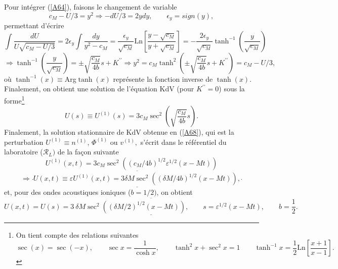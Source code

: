 \documentclass[10pt,thmsa]{article}
\begin{document}
Pour int\'{e}grer (\ref{A64}), faisons le changement de variable
\begin{equation}
c_{M}-U/3=y^{2}\Rightarrow-dU/3=2ydy,\qquad\epsilon_{y}=sign(y),\label{A65}%
\end{equation}
permettant d'\'{e}crire
\begin{equation}
\int\frac{dU}{U\sqrt{c_{M}-U/3}}=2\epsilon_{y}\int\frac{dy}{y^{2}-c_{M}}%
=\frac{\epsilon_{y}}{\sqrt{c_{M}}}\mathrm{Ln}\left[  \frac{y-\sqrt{c_{M}}%
}{y+\sqrt{c_{M}}}\right]  =-\frac{2\epsilon_{y}}{\sqrt{c_{M}}}\tanh^{-1}%
(\frac{y}{\sqrt{c_{M}}})\label{A66}%
\end{equation}
\begin{equation}
\Rightarrow\tanh^{-1}(\frac{y}{\sqrt{c_{M}}})=\pm\sqrt{\frac{c_{M}}{4b}%
}s+K^{\prime\prime}\Rightarrow y^{2}=c_{M}\tanh^{2}\left(  \pm\sqrt
{\frac{c_{M}}{4b}}s+K^{\prime\prime}\right)  =c_{M}-U/3,\label{A67}%
\end{equation}
o\`{u} $\tanh^{-1}(x)\equiv$Arg$\tanh(x)$ repr\'{e}sente la fonction inverse
de $\tanh(x)$. Finalement, on obtient une solution de l'\'{e}quation KdV (pour
$K^{\prime\prime}=0$) sous la forme\footnote{On tient compte des relations
suivantes
\[
\sec(x)=\sec(-x),\qquad\sec x=\frac{1}{\cosh x},\qquad\tanh^{2}x+\sec
^{2}x=1\qquad\tanh^{-1}x=\frac{1}{2}\mathrm{Ln}\left[  \frac{x+1}{x-1}\right]
.
\]
}
\begin{equation}
U(s)\equiv U^{(1)}(s)=3c_{M}\sec^{2}\left(  \sqrt{\frac{c_{M}}{4b}}s\right)
.\label{A68}%
\end{equation}
Finalement, la solution stationnaire de KdV obtenue en (\ref{A68}), qui est la
perturbation $U^{(1)}\equiv n^{(1)}$, $\Phi^{(1)}$ ou $v^{(1)},$ s'\'{e}crit
dans le r\'{e}f\'{e}rentiel du laboratoire ($\mathcal{R}_{L})$ de la fa\c{c}on
suivante
\begin{equation}
U^{(1)}(x,t)=3c_{M}\sec^{2}\left(  (c_{M}/4b)^{1/2}\varepsilon^{1/2}%
(x-Mt)\right) \label{A72}%
\end{equation}
\begin{equation}
\Rightarrow\overline{\underline{\frac{^{{}}}{{}}U(x,t)\equiv\varepsilon
U^{(1)}(x,t)=3\delta M\sec^{2}\left(  (\delta M/4b)^{1/2}(x-Mt)\right)
,\frac{^{{}}}{{}}}}\label{A73}%
\end{equation}
et, pour des ondes acoustiques ioniques ($b=1/2)$, on obtient
\begin{equation}
\overline{\underline{U(x,t)=U(s)=3\ \delta M\sec^{2}\left(  (\delta
M/2)^{1/2}(x-Mt)\right)  ,\qquad s=\varepsilon^{1/2}(x-Mt),\qquad b=\frac
{1}{2}.}}\label{A74}%
\end{equation}
\end{document}
